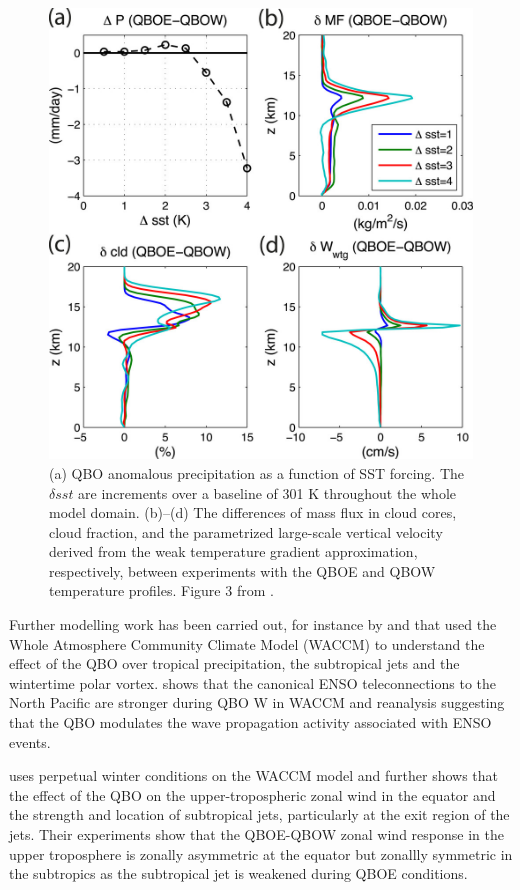 \begin{figure}[t!]
\centering
\includegraphics[width=0.85\linewidth]{figures/nie_sobel}
\caption[The non-linear relationship of the QBO with SST forcings]{(a) QBO anomalous precipitation as a function of SST forcing. The $\delta sst$ are increments over a baseline of 301 K throughout the whole model domain. (b)–(d) The differences of mass flux in cloud cores, cloud fraction, and the parametrized large-scale vertical velocity derived from the weak temperature gradient approximation, respectively, between experiments with the QBOE and QBOW temperature profiles. Figure 3 from \cite{nie2015}. }
\label{fig:nie}
\end{figure}  

Further modelling work has been carried out, for instance by \cite{garfinkel2010} and \cite{garfinkel2011} that used the Whole Atmosphere Community Climate Model (WACCM) to understand the effect of the QBO over tropical precipitation, the subtropical jets and the wintertime polar vortex. \cite{garfinkel2010} shows that the canonical ENSO teleconnections to the North Pacific are stronger during QBO W in WACCM and reanalysis suggesting that the QBO modulates the wave propagation activity associated with ENSO events.

 \cite{garfinkel2011} uses perpetual winter conditions on the WACCM model and further shows that the effect of the QBO on the upper-tropospheric zonal wind in the equator and the strength and location of subtropical jets, particularly at the exit region of the jets. Their experiments show that the QBOE-QBOW zonal wind response in the upper troposphere is zonally asymmetric at the equator but zonallly symmetric in the subtropics as the subtropical jet is weakened during QBOE conditions.

